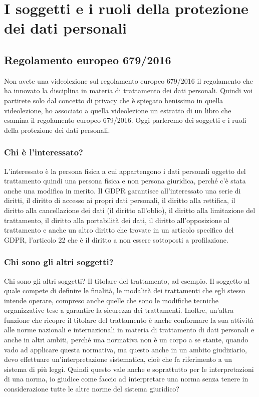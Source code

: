 \chapter{I soggetti e i ruoli della protezione dei dati personali}

\section{Regolamento europeo 679/2016}
Non avete una videolezione sul regolamento europeo 679/2016 il regolamento che ha innovato la disciplina in materia di trattamento dei dati personali.
Quindi voi partirete solo dal concetto di privacy che è spiegato benissimo in quella videolezione, ho associato a quella videolezione un estratto di un libro che esamina il regolamento europeo 679/2016.
Oggi parleremo dei soggetti e i ruoli della protezione dei dati personali.

\subsection{Chi è l'interessato?}

L'interessato è la persona fisica a cui appartengono i dati personali oggetto del trattamento quindi una persona fisica e non persona giuridica, perché c'è stata anche una modifica in merito.
Il GDPR garantisce all'interessato una serie di diritti, il diritto di accesso ai propri dati personali, il diritto alla rettifica, il diritto alla cancellazione dei dati (il diritto all'oblio), il diritto alla limitazione del trattamento, il diritto alla portabilità dei dati, il diritto all'opposizione al trattamento e anche un altro diritto che trovate in un articolo specifico del GDPR, l'articolo 22 che è il diritto a non essere sottoposti a profilazione.

\subsection{Chi sono gli altri soggetti?}
Chi sono gli altri soggetti?
Il titolare del trattamento, ad esempio.
Il soggetto al quale compete di definire le finalità, le modalità dei trattamenti che egli stesso intende operare, compreso anche quelle che sono le modifiche tecniche organizzative tese a garantire la sicurezza dei trattamenti.
Inoltre, un'altra funzione che ricopre il titolare del trattamento è anche conformare la sua attività alle norme nazionali e internazionali in materia di trattamento di dati personali e anche in altri ambiti, perché una normativa non è un corpo a se stante, quando vado ad applicare questa normativa, ma questo anche in un ambito giudiziario, devo effettuare un'interpretazione sistematica, cioè che fa riferimento a un sistema di più leggi.
Quindi questo vale anche e soprattutto per le interpretazioni di una norma, io giudice come faccio ad interpretare una norma senza tenere in considerazione tutte le altre norme del sistema giuridico?

